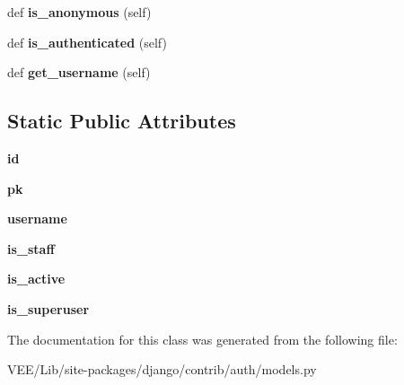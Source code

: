 \begin{DoxyCompactItemize}
def {\bfseries is\+\_\+anonymous} (self)
\item 
\mbox{\label{classdjango_1_1contrib_1_1auth_1_1models_1_1_anonymous_user_a0d039031b1ed6948e6715659f0a49a1c}} 
def {\bfseries is\+\_\+authenticated} (self)
\item 
\mbox{\label{classdjango_1_1contrib_1_1auth_1_1models_1_1_anonymous_user_a95cf71b95a4e15645ca06acfa2331a8d}} 
def {\bfseries get\+\_\+username} (self)
\end{DoxyCompactItemize}
\subsection*{Static Public Attributes}
\begin{DoxyCompactItemize}
\item 
\mbox{\label{classdjango_1_1contrib_1_1auth_1_1models_1_1_anonymous_user_a675c9fcae7fbcb3ef89d3da38e29d879}} 
{\bfseries id}
\item 
\mbox{\label{classdjango_1_1contrib_1_1auth_1_1models_1_1_anonymous_user_ab342b75c12a8286045e1bd6d80654c55}} 
{\bfseries pk}
\item 
\mbox{\label{classdjango_1_1contrib_1_1auth_1_1models_1_1_anonymous_user_a11a6b01a3af25111da9134a11a6c479e}} 
{\bfseries username}
\item 
\mbox{\label{classdjango_1_1contrib_1_1auth_1_1models_1_1_anonymous_user_a33f9dfda0ff46930be0a535b8c10e205}} 
{\bfseries is\+\_\+staff}
\item 
\mbox{\label{classdjango_1_1contrib_1_1auth_1_1models_1_1_anonymous_user_ab1dc7a38b069a20e9deb365e50b7f445}} 
{\bfseries is\+\_\+active}
\item 
\mbox{\label{classdjango_1_1contrib_1_1auth_1_1models_1_1_anonymous_user_a83d34c66df62d021e6467e42bfa01c7d}} 
{\bfseries is\+\_\+superuser}
\end{DoxyCompactItemize}


The documentation for this class was generated from the following file\+:\begin{DoxyCompactItemize}
\item 
V\+E\+E/\+Lib/site-\/packages/django/contrib/auth/models.\+py\end{DoxyCompactItemize}

